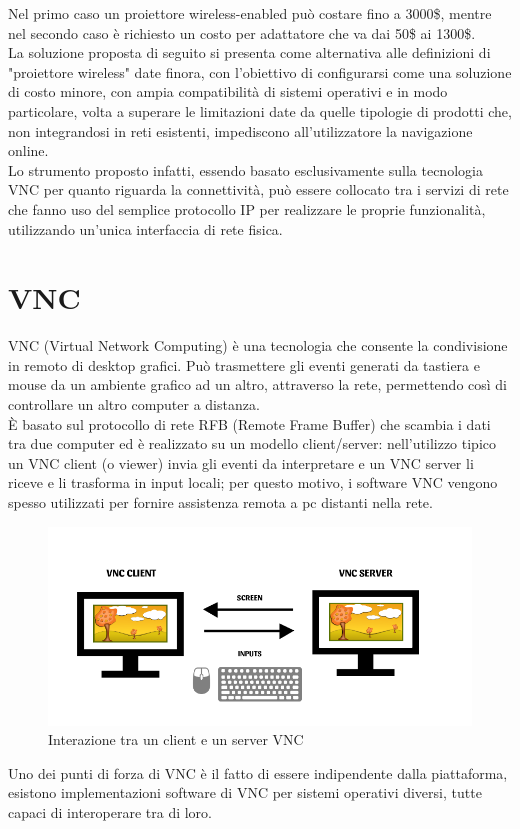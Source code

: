 Nel primo caso un proiettore wireless-enabled può costare fino a 3000\$, mentre nel secondo caso è richiesto un costo per adattatore che va dai 50\$ ai 1300\$.\\
La soluzione proposta di seguito si presenta come alternativa alle definizioni di "proiettore wireless" date finora, con l'obiettivo di configurarsi come una soluzione di costo minore, con ampia compatibilità di sistemi operativi e in modo particolare, volta a superare le limitazioni date da quelle tipologie di prodotti che, non integrandosi in reti esistenti, impediscono all'utilizzatore la navigazione online.\\
Lo strumento proposto infatti, essendo basato esclusivamente sulla tecnologia VNC per quanto riguarda la connettività, può essere collocato tra i servizi di rete che fanno uso del semplice protocollo IP per realizzare le proprie funzionalità, utilizzando un'unica interfaccia di rete fisica.

\section{VNC}
VNC (Virtual Network Computing) è una tecnologia che consente la condivisione in remoto di desktop grafici. Può trasmettere gli eventi generati da tastiera e mouse da un ambiente grafico ad un altro, attraverso la rete, permettendo così di controllare un altro computer a distanza.\\
È basato sul protocollo di rete RFB (Remote Frame Buffer) che scambia i dati tra due computer ed è realizzato su un modello client/server: nell'utilizzo tipico un VNC client (o viewer) invia gli eventi da interpretare e un  VNC server li riceve e li trasforma in input locali; per questo motivo, i software VNC vengono spesso utilizzati per fornire assistenza remota a pc distanti nella rete.\\
\begin{figure}[ht]
\includegraphics[width=\textwidth]{../img/vnc-client-server.png}
\centering
\caption{Interazione tra un client e un server VNC}
\end{figure}
Uno dei punti di forza di VNC è il fatto di essere indipendente dalla piattaforma, esistono implementazioni software di VNC per sistemi operativi diversi, tutte capaci di interoperare tra di loro.

